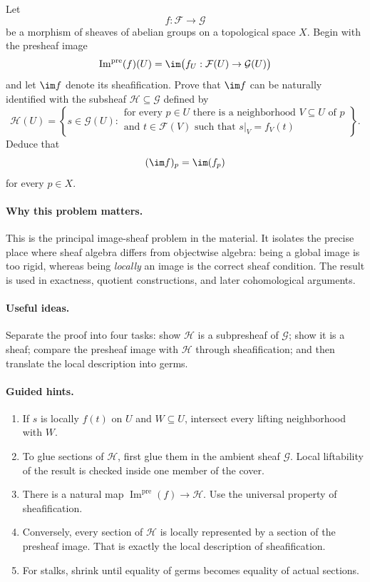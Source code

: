 \begin{problem}\label{prob:vi15-p1}
Let
\[
f:\mathcal F\longrightarrow\mathcal G
\]
be a morphism of sheaves of abelian groups on a topological space $X$.  Begin with the
presheaf image
\[
\operatorname{Im}^{\mathrm{pre}}(f)(U)=\im\bigl(f_U:\mathcal F(U)\to\mathcal G(U)\bigr)
\]
and let $\im f$ denote its sheafification.  Prove that $\im f$ can be naturally identified
with the subsheaf $\mathcal H\subseteq\mathcal G$ defined by
\[
\mathcal H(U)=\left\{s\in\mathcal G(U):
\begin{array}{l}
\text{for every }p\in U\text{ there is a neighborhood }V\subseteq U\text{ of }p\\
\text{and }t\in\mathcal F(V)\text{ such that }s|_V=f_V(t)
\end{array}\right\}.
\]
Deduce that
\[
(\im f)_p=\im(f_p)
\]
for every $p\in X$.
\end{problem}

\ifdefined\FullProblemDossiers
\paragraph{Why this problem matters.}
This is the principal image-sheaf problem in the material.  It isolates the precise
place where sheaf algebra differs from objectwise algebra: being a global image is too rigid,
whereas being \emph{locally} an image is the correct sheaf condition.  The result is used in
exactness, quotient constructions, and later cohomological arguments.

\paragraph{Useful ideas.}
Separate the proof into four tasks: show $\mathcal H$ is a subpresheaf of $\mathcal G$; show
it is a sheaf; compare the presheaf image with $\mathcal H$ through sheafification; and then
translate the local description into germs.

\paragraph{Guided hints.}
\begin{enumerate}
\item If $s$ is locally $f(t)$ on $U$ and $W\subseteq U$, intersect every lifting neighborhood
with $W$.
\item To glue sections of $\mathcal H$, first glue them in the ambient sheaf $\mathcal G$.
Local liftability of the result is checked inside one member of the cover.
\item There is a natural map $\operatorname{Im}^{\mathrm{pre}}(f)\to\mathcal H$.  Use the
universal property of sheafification.
\item Conversely, every section of $\mathcal H$ is locally represented by a section of the
presheaf image.  That is exactly the local description of sheafification.
\item For stalks, shrink until equality of germs becomes equality of actual sections.
\end{enumerate}

